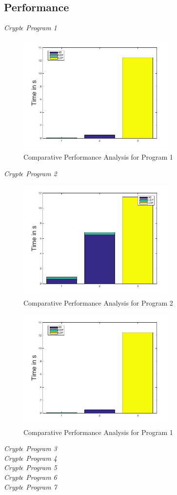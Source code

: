 \subsection{Performance}
\textit{Crypt$\epsilon$ Program 1}\\
\begin{figure}[h]
\includegraphics[width=8cm]{bar1.jpg}
\caption{Comparative Performance Analysis for Program 1}
\end{figure}
\textit{Crypt$\epsilon$ Program 2}\\\begin{figure}[h]
\includegraphics[width=8cm]{bar2.jpg}
\caption{Comparative Performance Analysis for Program 2}
\end{figure}
\begin{figure}[h]
\includegraphics[width=8cm]{bar1.jpg}
\caption{Comparative Performance Analysis for Program 1}
\end{figure}
\textit{Crypt$\epsilon$ Program 3}\\
\textit{Crypt$\epsilon$ Program 4}\\
\textit{Crypt$\epsilon$ Program 5}\\
\textit{Crypt$\epsilon$ Program 6}\\
\textit{Crypt$\epsilon$ Program 7}\\



